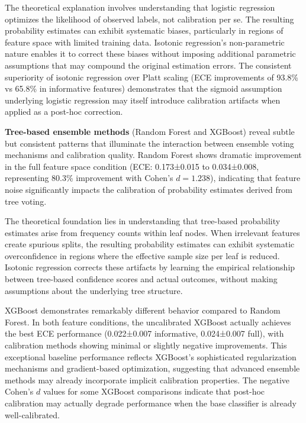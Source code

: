 \documentclass[12pt, a4paper]{article}
\begin{document}
The theoretical explanation involves understanding that logistic regression optimizes the likelihood of observed labels, not calibration per se. The resulting probability estimates can exhibit systematic biases, particularly in regions of feature space with limited training data. Isotonic regression's non-parametric nature enables it to correct these biases without imposing additional parametric assumptions that may compound the original estimation errors. The consistent superiority of isotonic regression over Platt scaling (ECE improvements of 93.8\% vs 65.8\% in informative features) demonstrates that the sigmoid assumption underlying logistic regression may itself introduce calibration artifacts when applied as a post-hoc correction.

\textbf{Tree-based ensemble methods} (Random Forest and XGBoost) reveal subtle but consistent patterns that illuminate the interaction between ensemble voting mechanisms and calibration quality. Random Forest shows dramatic improvement in the full feature space condition (ECE: 0.173±0.015 to 0.034±0.008, representing 80.3\% improvement with Cohen's $d = 1.238$), indicating that feature noise significantly impacts the calibration of probability estimates derived from tree voting.

The theoretical foundation lies in understanding that tree-based probability estimates arise from frequency counts within leaf nodes. When irrelevant features create spurious splits, the resulting probability estimates can exhibit systematic overconfidence in regions where the effective sample size per leaf is reduced. Isotonic regression corrects these artifacts by learning the empirical relationship between tree-based confidence scores and actual outcomes, without making assumptions about the underlying tree structure.

XGBoost demonstrates remarkably different behavior compared to Random Forest. In both feature conditions, the uncalibrated XGBoost actually achieves the best ECE performance (0.022±0.007 informative, 0.024±0.007 full), with calibration methods showing minimal or slightly negative improvements. This exceptional baseline performance reflects XGBoost's sophisticated regularization mechanisms and gradient-based optimization, suggesting that advanced ensemble methods may already incorporate implicit calibration properties. The negative Cohen's $d$ values for some XGBoost comparisons indicate that post-hoc calibration may actually degrade performance when the base classifier is already well-calibrated.
\end{document}
